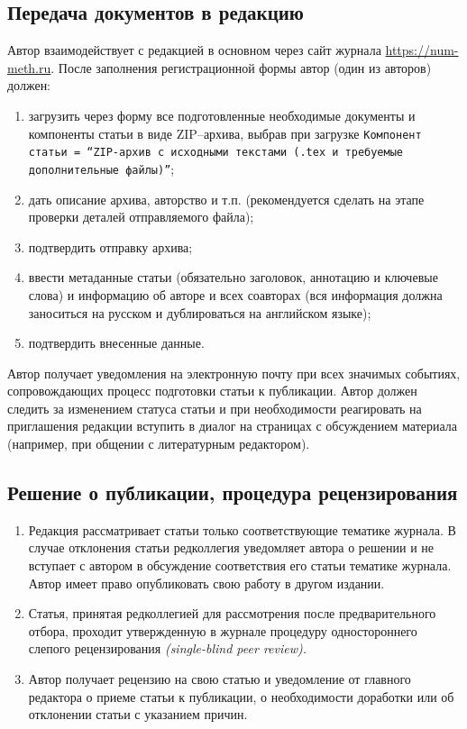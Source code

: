 \documentclass[10pt,a4paper]{book}
\begin{document}
\subsection{Передача документов в редакцию}
Автор взаимодействует с редакцией в основном через сайт журнала 
\url{https://num-meth.ru}.
После заполнения регистрационной формы автор (один из авторов) должен:
\begin{enumerate}[itemsep=0pt,parsep=2pt,topsep=2pt,partopsep=0pt]
\renewcommand{\labelenumi}{\arabic{enumi})}
\item загрузить через форму все подготовленные необходимые документы и компоненты статьи 
      в виде ZIP--архива, выбрав при загрузке {\tt Компонент статьи = 
      ``ZIP-архив с исходными текстами (.tex и требуемые дополнительные файлы)''};
\item дать описание архива, авторство и т.п. (рекомендуется сделать на этапе
      проверки деталей отправляемого файла);
\item подтвердить отправку архива;
\item ввести метаданные статьи (обязательно заголовок, аннотацию и ключевые слова) 
      и информацию об авторе и всех соавторах (вся информация должна заноситься на 
      русском и дублироваться на английском языке);
\item подтвердить внесенные данные.
\end{enumerate}

Автор получает уведомления на электронную почту при всех значимых событиях, сопровождающих
процесс подготовки статьи к публикации. Автор должен следить за изменением статуса статьи 
и при необходимости реагировать на приглашения редакции вступить в диалог на страницах с 
обсуждением материала (например, при общении с литературным редактором).

\subsection{Решение о публикации, процедура рецензирования}

\begin{enumerate}[itemsep=0pt,parsep=2pt,topsep=2pt,partopsep=0pt]
\item Редакция рассматривает статьи только соответствующие тематике журнала. В случае
      отклонения статьи редколлегия уведомляет автора о решении и не вступает с автором в 
      обсуждение соответствия его статьи тематике журнала.
      Автор имеет право опубликовать свою работу в другом издании.
\item Статья, принятая редколлегией для рассмотрения после предварительного отбора,
      проходит утвержденную в журнале процедуру одностороннего слепого рецензирования
      {\itshape (single-blind peer review).}
\item Автор получает рецензию на свою статью и уведомление от главного редактора о приеме 
      статьи к публикации, о необходимости доработки или об отклонении статьи с 
      указанием причин.
\end{enumerate}
\end{document}

